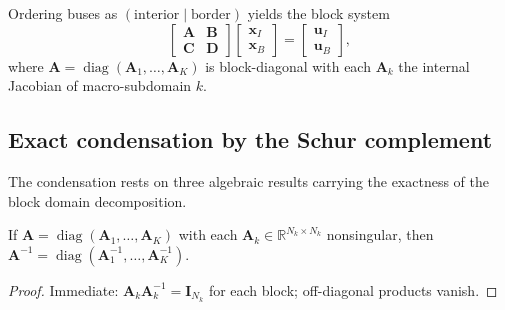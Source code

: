 Ordering buses as $(\text{interior} \mid \text{border})$ yields the block system
\begin{equation}
\begin{bmatrix} \mathbf{A} & \mathbf{B} \\ \mathbf{C} & \mathbf{D} \end{bmatrix} \begin{bmatrix} \mathbf{x}_I \\ \mathbf{x}_B \end{bmatrix} = \begin{bmatrix} \mathbf{u}_I \\ \mathbf{u}_B \end{bmatrix},
\label{eq:blockform}
\end{equation}
where $\mathbf{A} = \operatorname{diag}(\mathbf{A}_1, \dots, \mathbf{A}_K)$ is block-diagonal with each $\mathbf{A}_k$ the internal Jacobian of macro-subdomain $k$.

\subsection{Exact condensation by the Schur complement}
\label{sub:schur}

The condensation rests on three algebraic results carrying the exactness of the block domain decomposition.

\begin{lemma}
\label{lem:blockdiag}
If $\mathbf{A} = \operatorname{diag}(\mathbf{A}_1, \dots, \mathbf{A}_K)$ with each $\mathbf{A}_k \in \mathbb{R}^{N_k \times N_k}$ nonsingular, then $\mathbf{A}^{-1} = \operatorname{diag}(\mathbf{A}_1^{-1}, \dots, \mathbf{A}_K^{-1})$.
\end{lemma}
\begin{proof}
Immediate: $\mathbf{A}_k \mathbf{A}_k^{-1} = \mathbf{I}_{N_k}$ for each block; off-diagonal products vanish.
\end{proof}

